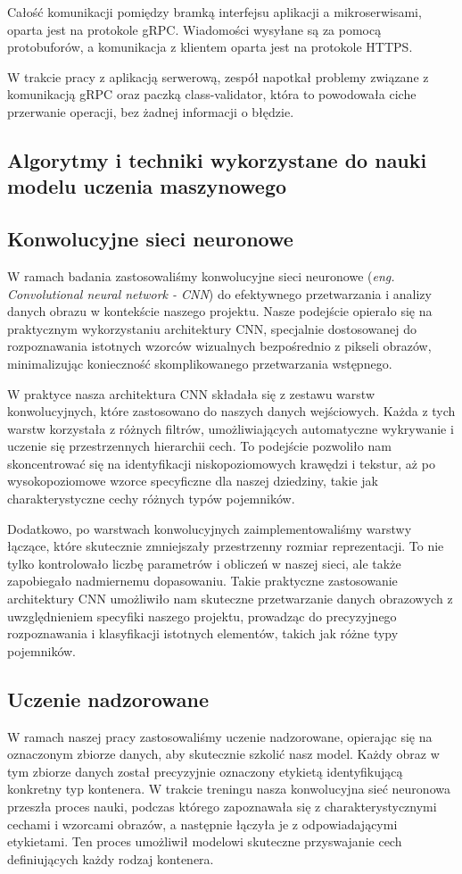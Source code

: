 \documentclass[12pt, a4paper, twoside, openany]{book}
\newcommand{\forceindent}{\leavevmode{\parindent=1.3em\indent}}
\begin{document}
Całość komunikacji pomiędzy bramką interfejsu aplikacji a mikroserwisami, oparta jest na protokole gRPC. Wiadomości wysyłane są za pomocą protobuforów, a komunikacja z klientem oparta jest na protokole HTTPS.

W trakcie pracy z aplikacją serwerową, zespół napotkał problemy związane z komunikacją gRPC oraz paczką class-validator, która to powodowała ciche przerwanie operacji, bez żadnej informacji o błędzie.

\subsection{Algorytmy i techniki wykorzystane do nauki modelu uczenia maszynowego}
\forceindent \subsection{Konwolucyjne sieci neuronowe}
\forceindent W ramach badania zastosowaliśmy konwolucyjne sieci neuronowe (\textit{eng. Convolutional neural network - CNN}) do efektywnego przetwarzania i analizy danych obrazu w kontekście naszego projektu. Nasze podejście opierało się na praktycznym wykorzystaniu architektury CNN, specjalnie dostosowanej do rozpoznawania istotnych wzorców wizualnych bezpośrednio z pikseli obrazów, minimalizując konieczność skomplikowanego przetwarzania wstępnego.

W praktyce nasza architektura CNN składała się z zestawu warstw konwolucyjnych, które zastosowano do naszych danych wejściowych. Każda z tych warstw korzystała z różnych filtrów, umożliwiających automatyczne wykrywanie i uczenie się przestrzennych hierarchii cech. To podejście pozwoliło nam skoncentrować się na identyfikacji niskopoziomowych krawędzi i tekstur, aż po wysokopoziomowe wzorce specyficzne dla naszej dziedziny, takie jak charakterystyczne cechy różnych typów pojemników.

Dodatkowo, po warstwach konwolucyjnych zaimplementowaliśmy warstwy łączące, które skutecznie zmniejszały przestrzenny rozmiar reprezentacji. To nie tylko kontrolowało liczbę parametrów i obliczeń w naszej sieci, ale także zapobiegało nadmiernemu dopasowaniu. Takie praktyczne zastosowanie architektury CNN umożliwiło nam skuteczne przetwarzanie danych obrazowych z uwzględnieniem specyfiki naszego projektu, prowadząc do precyzyjnego rozpoznawania i klasyfikacji istotnych elementów, takich jak różne typy pojemników.

\subsection{Uczenie nadzorowane}
\forceindent W ramach naszej pracy zastosowaliśmy uczenie nadzorowane, opierając się na oznaczonym zbiorze danych, aby skutecznie szkolić nasz model. Każdy obraz w tym zbiorze danych został precyzyjnie oznaczony etykietą identyfikującą konkretny typ kontenera. W trakcie treningu nasza konwolucyjna sieć neuronowa przeszła proces nauki, podczas którego zapoznawała się z charakterystycznymi cechami i wzorcami obrazów, a następnie łączyła je z odpowiadającymi etykietami. Ten proces umożliwił modelowi skuteczne przyswajanie cech definiujących każdy rodzaj kontenera.
\end{document}
